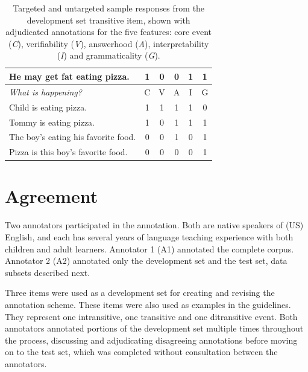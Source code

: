 \begin{table}[htb!]
\begin{center}
\begin{tabular}{|l|c|c|c|c|c|}
\hline
He may get fat eating pizza. & 1 & 0 & 0 & 1 & 1 \\
\hline
\hline
\hline
\textit{What is happening?} & C & V & A & I & G \\
\hline
\hline
Child is eating pizza. & 1 & 1 & 1 & 1 & 0 \\
\hline
Tommy is eating pizza. & 1 & 0 & 1 & 1 & 1 \\
\hline
The boy's eating his favorite food. & 0 & 0 & 1 & 0 & 1 \\
\hline
Pizza is this boy's favorite food. & 0 & 0 & 0 & 0 & 1 \\
\hline
\end{tabular}
\caption{\label{tab:dev-transitive} Targeted and untargeted sample responses from the development set transitive item, shown with adjudicated annotations for the five features: core event (\textit{C}), verifiability (\textit{V}), answerhood (\textit{A}), interpretability (\textit{I}) and grammaticality (\textit{G}).}
\end{center}
\end{table}

\section{Agreement}
\label{sec:agreement}
Two annotators participated in the annotation. Both are native speakers of (US) English, and each has several years of language teaching experience with both children and adult learners. Annotator 1 (A1) annotated the complete corpus. Annotator 2 (A2) annotated only the development set and the test set, data subsets described next.

Three items were used as a development set for creating and revising the annotation scheme. These items were also used as examples in the guidelines. They represent one intransitive, one transitive and one ditransitive event. Both annotators annotated portions of the development set multiple times throughout the process, discussing and adjudicating disagreeing annotations before moving on to the test set, which was completed without consultation between the annotators.

